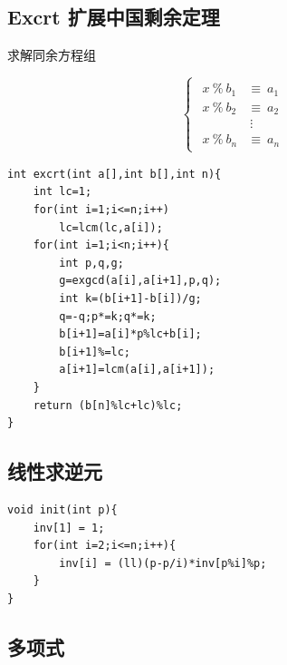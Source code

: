 \documentclass[a4]{ctexart}
\begin{document}
\subsection{Excrt 扩展中国剩余定理}
\begin{center}
	求解同余方程组
\end{center}

\[
\begin{cases}
	\begin{aligned}
	x \ \% \ b_1  &\equiv \  a_1\\
	x \ \% \ b_2  &\equiv \ a_2\\
	           		& \ \vdots   \\
	x \ \% \ b_n  &\equiv  \ a_n
	\end{aligned}
\end{cases}
\]

  
  
\begin{lstlisting}
int excrt(int a[],int b[],int n){
    int lc=1;
    for(int i=1;i<=n;i++)
        lc=lcm(lc,a[i]);
    for(int i=1;i<n;i++){
        int p,q,g;
        g=exgcd(a[i],a[i+1],p,q);
        int k=(b[i+1]-b[i])/g;
        q=-q;p*=k;q*=k;
        b[i+1]=a[i]*p%lc+b[i];
        b[i+1]%=lc;
        a[i+1]=lcm(a[i],a[i+1]);
    }
    return (b[n]%lc+lc)%lc;
}
\end{lstlisting}

\subsection{线性求逆元}
\begin{lstlisting}
void init(int p){
	inv[1] = 1;
	for(int i=2;i<=n;i++){
		inv[i] = (ll)(p-p/i)*inv[p%i]%p;
	}
}
\end{lstlisting}
\subsection{多项式}
\end{document}
